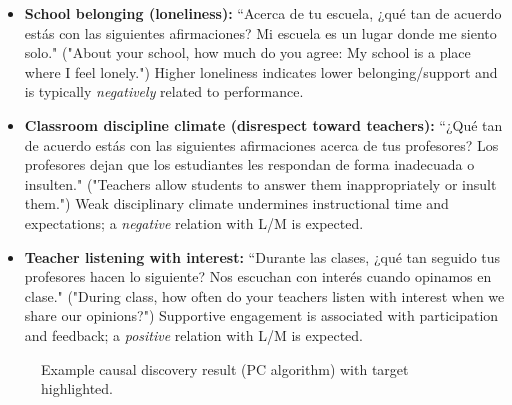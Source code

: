 \documentclass[11pt, a4paper]{article}
\begin{document}
\begin{itemize}
  \item \textbf{School belonging (loneliness):} ``Acerca de tu escuela, ¿qué tan de acuerdo estás con las siguientes afirmaciones? Mi escuela es un lugar donde me siento solo." ("About your school, how much do you agree: My school is a place where I feel lonely.") Higher loneliness indicates lower belonging/support and is typically \emph{negatively} related to performance.
  \item \textbf{Classroom discipline climate (disrespect toward teachers):} ``¿Qué tan de acuerdo estás con las siguientes afirmaciones acerca de tus profesores? Los profesores dejan que los estudiantes les respondan de forma inadecuada o insulten." ("Teachers allow students to answer them inappropriately or insult them.") Weak disciplinary climate undermines instructional time and expectations; a \emph{negative} relation with L/M is expected.
  \item \textbf{Teacher listening with interest:} ``Durante las clases, ¿qué tan seguido tus profesores hacen lo siguiente? Nos escuchan con interés cuando opinamos en clase." ("During class, how often do your teachers listen with interest when we share our opinions?") Supportive engagement is associated with participation and feedback; a \emph{positive} relation with L/M is expected.
\end{itemize}

\begin{figure}[h]
  \centering
  \caption{Example causal discovery result (PC algorithm) with target highlighted.}
\end{figure}
\end{document}

